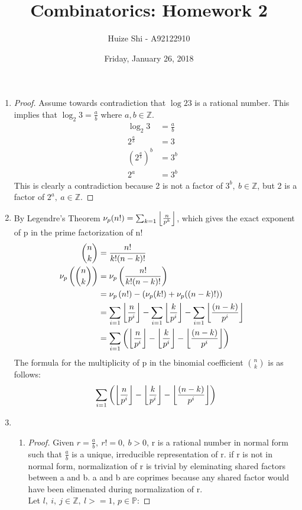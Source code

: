 \documentclass{article}
\title{Combinatorics: Homework 2}
\author{Huize Shi - A92122910}
\date{Friday, January 26, 2018}
\DeclarePairedDelimiter{\floor}{\lfloor}{\rfloor}
\begin{document}
\maketitle

\begin{enumerate}[label=\textbf{\arabic*}.]
	\item  %
		\begin{proof}Assume towards contradiction that $\log{2}{3}$ is a 
			rational number. This implies that $\log_2 3=\frac{a}{b}$ where $a, b
			\in \mathbb{Z}$.\\
			\begin{align*}
				\log_2 3 &= \frac{a}{b}&\\
				2^{\frac{a}{b}} &= 3&\\
				(2^{\frac{a}{b}})^b &= 3^b&\\
				2^a &= 3^b&
			\end{align*}
			This is clearly a contradiction because 2 is not a factor of $3^b,\
			b\in\mathbb{Z}$, but 2 is a factor of  $2^a,\ a\in\mathbb{Z}$.
		\end{proof}

	\item  %
		By Legendre's Theorem
		$\nu_p(n!)=\sum_{k=1}{\floor*{\frac{n}{p^k}}}$, which gives the exact
		exponent of p in the prime factorization of n!
		\begin{align*}
			{n \choose k} &= \frac{n!}{k!(n-k)!}&\\
			\nu_p\left({n \choose k}\right ) &= \nu_p\left(\frac{n!}{k!(n-k)!}\right )&\\
													 &= \nu_p\left(n!\right ) - (\nu_p(k!) + \nu_p((n-k)!))&\\
													 &= \sum_{i=1}{\floor*{\frac{n}{p^i}}} -
													 \sum_{i=1}{\floor*{\frac{k}{p^i}}} - 
													 \sum_{i=1}{\floor*{\frac{(n-k)}{p^i}}}&\\
													 &= \sum_{i=1}{\left(\floor*{\frac{n}{p^i}} -
													 \floor*{\frac{k}{p^i}} - 
													 \floor*{\frac{(n-k)}{p^i}}\right )}&
		\end{align*}
		The formula for the multiplicity of p in the binomial coefficient ${n \choose
		k}$ is as follows: 
		$$\sum_{i=1}{\left(\floor*{\frac{n}{p^i}} - \floor*{\frac{k}{p^i}} - \floor*{\frac{(n-k)}{p^i}}\right )}$$

	\item \quad  %
		\begin{enumerate}
			\item  %
				\begin{proof}
				Given $r = \frac{a}{b},\ r!=0,\ b>0$, r is a rational number in normal form such
				that $\frac{a}{b}$ is a unique, irreducible representation of r. if r is
				not in normal form, normalization of r is trivial by eleminating shared
				factors between a and b.	
				a and b are coprimes because any shared factor would have been
				elimenated during normalization of r. \\
				Let $l,\ i,\ j \in \mathbb{Z},\ l >= 1$, $p \in \mathbb{P}$:


\end{proof}
\end{enumerate}
\end{enumerate}
\end{document}
